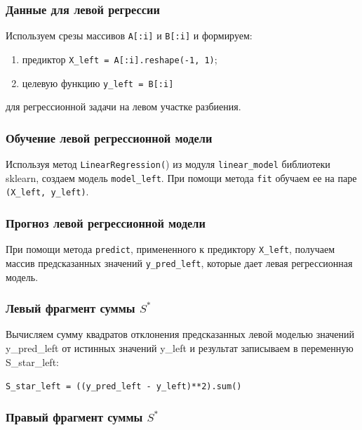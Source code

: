 \documentclass[a4paper,12pt]{article}
\begin{document}
\subsubsection{Данные для левой регрессии}

Используем срезы массивов \texttt{A[:i]} и \texttt{B[:i]} и формируем: 

\medskip\noindent
\begin{enumerate}
	\item предиктор \texttt{X\_left = A[:i].reshape(-1, 1)};
	\item целевую функцию \texttt{y\_left = B[:i]}
\end{enumerate}

\medskip\noindent
для регрессионной задачи на левом участке разбиения.

\subsubsection{Обучение левой регрессионной модели} 

Используя метод \texttt{LinearRegression(}) из модуля \texttt{linear\_model} библиотеки sklearn, создаем модель \texttt{model\_left}. При помощи метода \texttt{fit} обучаем ее на паре \texttt{(X\_left, y\_left)}.

\subsubsection{Прогноз левой регрессионной модели}

При помощи метода \texttt{predict}, примененного к предиктору \texttt{X\_left}, получаем массив предсказанных значений \texttt{y\_pred\_left}, которые дает левая регрессионная модель.


\subsubsection{Левый фрагмент суммы $S^*$}

Вычисляем сумму квадратов отклонения предсказанных левой моделью значений y\_pred\_left от истинных значений y\_left и результат записываем в переменную S\_star\_left:

\medskip\noindent
\texttt{S\_star\_left = ((y\_pred\_left - y\_left)**2).sum()}


\subsubsection{Правый фрагмент суммы $S^*$}
\end{document}

